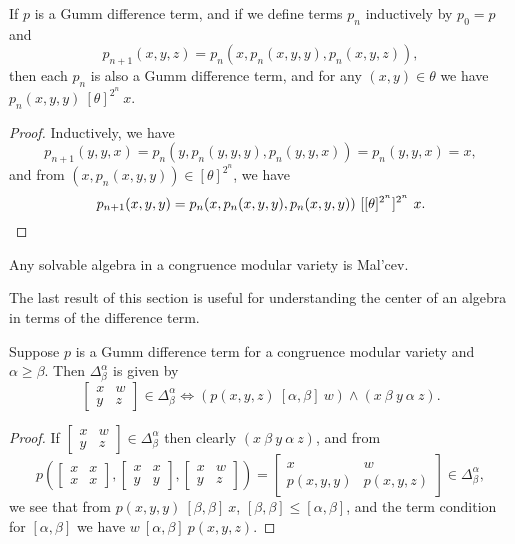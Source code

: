 \begin{appendices}
\begin{prop} If $p$ is a Gumm difference term, and if we define terms $p_n$ inductively by $p_0 = p$ and
\[
p_{n+1}(x,y,z) = p_n(x,p_n(x,y,y),p_n(x,y,z)),
\]
then each $p_n$ is also a Gumm difference term, and for any $(x,y) \in \theta$ we have $p_n(x,y,y)\ [\theta]^{2^n}\ x$.
\end{prop}
\begin{proof} Inductively, we have
\[
p_{n+1}(y,y,x) = p_n(y,p_n(y,y,y),p_n(y,y,x)) = p_n(y,y,x) = x,
\]
and from $(x,p_n(x,y,y)) \in [\theta]^{2^n}$, we have
\[
p_{n+1}(x,y,y) = p_n(x,p_n(x,y,y),p_n(x,y,y))\ [[\theta]^{2^n}]^{2^n}\ x.\qedhere
\]
\end{proof}

\begin{cor} Any solvable algebra in a congruence modular variety is Mal'cev.
\end{cor}

The last result of this section is useful for understanding the center of an algebra in terms of the difference term.

\begin{thm}\label{difference-commutator} Suppose $p$ is a Gumm difference term for a congruence modular variety and $\alpha \ge \beta$. Then $\Delta_\beta^\alpha$ is given by
\[
\begin{bmatrix} x & w\\ y & z\end{bmatrix} \in \Delta_\beta^\alpha \iff (p(x,y,z)\ [\alpha,\beta]\ w) \wedge (x\ \beta\ y\ \alpha\ z).
\]
\end{thm}
\begin{proof} If $\begin{bmatrix} x & w\\ y & z\end{bmatrix} \in \Delta_\beta^\alpha$ then clearly $(x\ \beta\ y\ \alpha\ z)$, and from
\[
p\left(\begin{bmatrix} x & x\\ x & x\end{bmatrix}, \begin{bmatrix} x & x\\ y & y\end{bmatrix}, \begin{bmatrix} x & w\\ y & z\end{bmatrix}\right) = \begin{bmatrix} x & w\\ p(x,y,y) & p(x,y,z)\end{bmatrix} \in \Delta_\beta^\alpha,
\]
we see that from $p(x,y,y)\ [\beta,\beta]\ x$, $[\beta,\beta] \le [\alpha,\beta]$, and the term condition for $[\alpha,\beta]$ we have $w\ [\alpha,\beta]\ p(x,y,z)$.


\end{proof}
\end{appendices}
